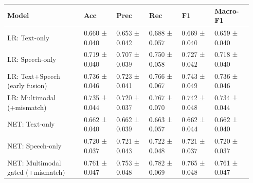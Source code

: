 \begin{tabular}{llllll}
\toprule
Model & Acc & Prec & Rec & F1 & Macro-F1 \\
\midrule
LR: Text-only & 0.660 ± 0.040 & 0.653 ± 0.042 & 0.688 ± 0.057 & 0.669 ± 0.040 & 0.659 ± 0.040 \\
LR: Speech-only & 0.719 ± 0.040 & 0.707 ± 0.039 & 0.750 ± 0.058 & 0.727 ± 0.042 & 0.718 ± 0.040 \\
LR: Text+Speech (early fusion) & 0.736 ± 0.046 & 0.723 ± 0.041 & 0.766 ± 0.067 & 0.743 ± 0.049 & 0.736 ± 0.046 \\
LR: Multimodal (+mismatch) & 0.735 ± 0.044 & 0.720 ± 0.037 & 0.767 ± 0.070 & 0.742 ± 0.048 & 0.734 ± 0.044 \\
NET: Text-only & 0.662 ± 0.040 & 0.662 ± 0.039 & 0.663 ± 0.057 & 0.662 ± 0.044 & 0.662 ± 0.040 \\
NET: Speech-only & 0.720 ± 0.037 & 0.721 ± 0.043 & 0.722 ± 0.048 & 0.721 ± 0.037 & 0.720 ± 0.037 \\
NET: Multimodal gated (+mismatch) & 0.761 ± 0.047 & 0.753 ± 0.048 & 0.782 ± 0.069 & 0.765 ± 0.048 & 0.761 ± 0.047 \\
\bottomrule
\end{tabular}
